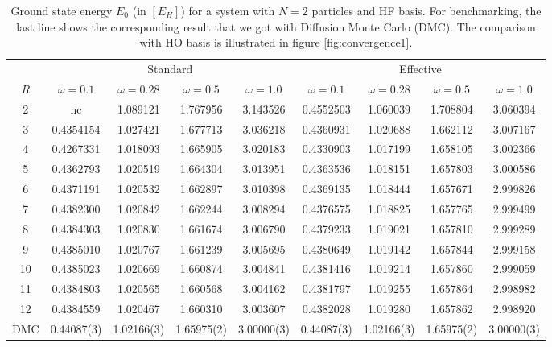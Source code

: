 \begin{table}
\begin{center}
\tabcolsep=0.07cm
\begin{tabular}{|c|cccc|cccc|}
\hline\hline
& \multicolumn{4}{c}{Standard} & \multicolumn{4}{c|}{Effective} \\
$R$  & $\omega = 0.1$ & $\omega = 0.28$ & $\omega=0.5$ & $\omega=1.0$ & $\omega = 0.1$ & $\omega = 0.28$ & $\omega=0.5$ & $\omega=1.0$\\
\hline
2 &nc &1.089121 &1.767956 & 3.143526 & 0.4552503&1.060039 &1.708804 &3.060394 \\
3 & 0.4354154&1.027421 &1.677713 & 3.036218 &0.4360931 &1.020688 &1.662112 & 3.007167\\
4 & 0.4267331&1.018093 &1.665905 & 3.020183  &0.4330903 &1.017199 &1.658105 &3.002366 \\
5 &0.4362793 &1.020519 & 1.664304& 3.013951 &0.4363536 &1.018151 &1.657803 &3.000586 \\
6 &0.4371191 &1.020532&1.662897 &3.010398  &0.4369135 &1.018444 &1.657671 &2.999826 \\
7 &0.4382300 &1.020842 &1.662244 & 3.008294 &0.4376575 &1.018825 &1.657765 &2.999499 \\
8 &0.4384303 &1.020830 &1.661674 & 3.006790 &0.4379233 &1.019021 &1.657810 &2.999289 \\
9 &0.4385010 &1.020767 &1.661239 & 3.005695 &0.4380649 &1.019142 &1.657844 & 2.999158 \\
10 &0.4385023 &1.020669 &1.660874 & 3.004841  &0.4381416 &1.019214 &1.657860 &2.999059 \\
11 &0.4384803 &1.020565 &1.660568 & 3.004162 &0.4381797 &1.019255 &1.657864 &2.998982 \\
12 &0.4384559 & 1.020467&1.660310 & 3.003607 &0.4382028 &1.019280 &1.657862 & 2.998920\\
\hline
DMC &0.44087(3) &1.02166(3) &1.65975(2) &3.00000(3) & 0.44087(3) &1.02166(3) &1.65975(2) &3.00000(3)\\ %
\hline\hline
\end{tabular}
\end{center}
\caption{Ground state energy $E_0$ (in $\left[E_H\right]$) for a system with $N=2$ particles and HF basis. For benchmarking, the last line shows the corresponding result that we got with Diffusion Monte Carlo (DMC). The comparison with HO basis is illustrated in figure \ref{fig:convergence1}. }
\label{tab:imsrg2-2partho}
\end{table}

